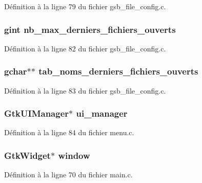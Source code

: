 Définition à la ligne 79 du fichier gsb\_\-file\_\-config.c.

\subsubsection[{nb\_\-max\_\-derniers\_\-fichiers\_\-ouverts}]{\setlength{\rightskip}{0pt plus 5cm}gint {\bf nb\_\-max\_\-derniers\_\-fichiers\_\-ouverts}}\label{menu_8c_a691d56f7a427c60a7714f6bec232807b}


Définition à la ligne 82 du fichier gsb\_\-file\_\-config.c.

\subsubsection[{tab\_\-noms\_\-derniers\_\-fichiers\_\-ouverts}]{\setlength{\rightskip}{0pt plus 5cm}gchar$\ast$$\ast$ {\bf tab\_\-noms\_\-derniers\_\-fichiers\_\-ouverts}}\label{menu_8c_a29a380dfbc7b7bc62547a1c0f5d95ff4}


Définition à la ligne 83 du fichier gsb\_\-file\_\-config.c.

\subsubsection[{ui\_\-manager}]{\setlength{\rightskip}{0pt plus 5cm}GtkUIManager$\ast$ {\bf ui\_\-manager}}\label{menu_8c_aa6a3b64b294a67080fe530ae293bce63}


Définition à la ligne 84 du fichier menu.c.

\subsubsection[{window}]{\setlength{\rightskip}{0pt plus 5cm}GtkWidget$\ast$ {\bf window}}\label{menu_8c_a3d346c08cf2d67c388caabffb412b293}


Définition à la ligne 70 du fichier main.c.

